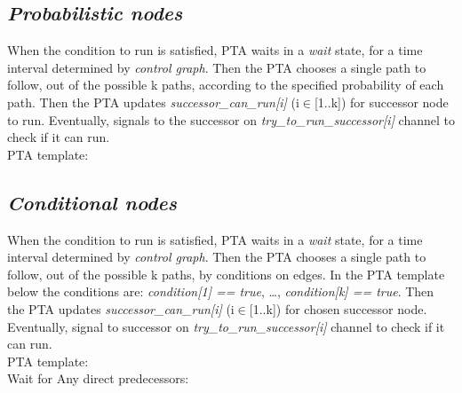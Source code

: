 \subsection{\textit{Probabilistic nodes}}
When the condition to run is satisfied, PTA waits in a \textcolor{ColorUppaalState}{\textit{wait}} state, for a time interval determined by \textit{control graph}. Then the PTA chooses a single path to follow, out of the possible k paths, according to the specified probability of each path. Then the PTA updates \textcolor{ColorEdgeGuard}{\textit{successor_can_run[i]}} (i$\in$[1..k]) for successor node to run. Eventually, signals to the successor on \textcolor{ColorUppaalChannel}{\textit{try_to_run_successor[i]}} channel to check if it can run. \\
PTA template:\\
 \clearpage
\subsection{\textit{Conditional nodes}}
When the condition to run is satisfied, PTA waits in a \textcolor{ColorUppaalState}{\textit{wait}} state, for a time interval determined by \textit{control graph}. Then the PTA chooses a single path to follow, out of the possible k paths, by conditions on edges. In the PTA template below the conditions are: \textcolor{ColorEdgeGuard}{\textit{condition[1] == true}}, …, \textcolor{ColorEdgeGuard}{\textit{condition[k] == true}}. Then the PTA updates \textcolor{ColorEdgeGuard}{\textit{successor_can_run[i]}} (i$\in$[1..k]) for chosen successor node. Eventually, signal to successor on \textcolor{ColorUppaalChannel}{\textit{try_to_run_successor[i]}} channel to check if it can run.\\
PTA template:\\
 {Wait for Any direct predecessors: }{} \clearpage
